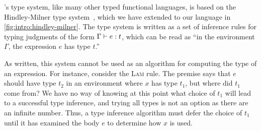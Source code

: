 
\ocaml's type system, like many other typed functional languages, is
based on the Hindley-Milner type
system~\citep{Hindley1969-pb,Milner1978-da}, which we have extended to
our language in \autoref{fig:intro:hindley-milner}.
%
The type system is written as a set of inference rules for typing
judgments of the form $\Gamma \vdash e : t$, which can be read as ``in
the environment $\Gamma$, the expression $e$ has type $t$.''

As written, this system cannot be used as an algorithm for computing the
type of an expression.
%
For instance, consider the \textsc{Lam} rule.
%
The premise says that $e$ should have type $t_2$ in an environment where
$x$ has type $t_1$, but where did $t_1$ come from?
%
We have no way of knowing at this point what choice of $t_1$ will lead
to a successful type inference, and trying all types is not an option
as there are an infinite number.
%
Thus, a type inference algorithm must defer the choice of $t_1$ until it
has examined the body $e$ to determine how $x$ is used.


